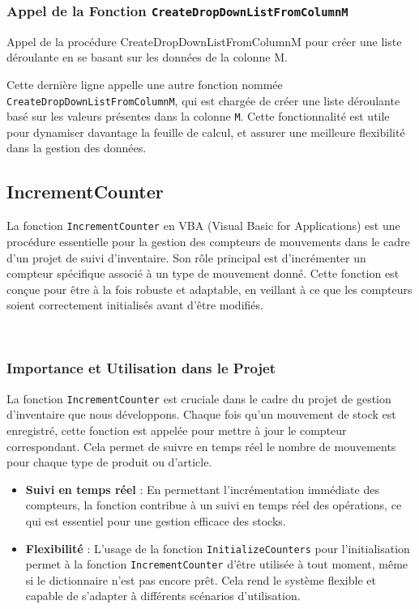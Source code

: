 \documentclass[a4paper, oneside, 12pt, final]{extreport}
\begin{document}
\subsubsection{Appel de la Fonction \texttt{CreateDropDownListFromColumnM}}

Appel de la procédure CreateDropDownListFromColumnM pour créer une liste déroulante en se basant sur les données de la colonne M.

Cette dernière ligne appelle une autre fonction nommée \texttt{CreateDropDownListFromColumnM}, qui est chargée de créer une liste déroulante basé sur les valeurs présentes dans la colonne \texttt{M}. Cette fonctionnalité est utile pour dynamiser davantage la feuille de calcul, et assurer une meilleure flexibilité dans la gestion des données.


\subsection{IncrementCounter}
La fonction \texttt{IncrementCounter} en VBA (Visual Basic for Applications) est une procédure essentielle pour la gestion des compteurs de mouvements dans le cadre d'un projet de suivi d'inventaire. Son rôle principal est d'incrémenter un compteur spécifique associé à un type de mouvement donné. Cette fonction est conçue pour être à la fois robuste et adaptable, en veillant à ce que les compteurs soient correctement initialisés avant d'être modifiés.

\

\subsubsection{Importance et Utilisation dans le Projet}
La fonction \texttt{IncrementCounter} est cruciale dans le cadre du projet de gestion d'inventaire que nous développons. Chaque fois qu'un mouvement de stock est enregistré, cette fonction est appelée pour mettre à jour le compteur correspondant. Cela permet de suivre en temps réel le nombre de mouvements pour chaque type de produit ou d'article.

\begin{itemize}
    \item \textbf{Suivi en temps réel} : En permettant l'incrémentation immédiate des compteurs, la fonction contribue à un suivi en temps réel des opérations, ce qui est essentiel pour une gestion efficace des stocks.
    \item \textbf{Flexibilité} : L'usage de la fonction \texttt{InitializeCounters} pour l'initialisation permet à la fonction \texttt{IncrementCounter} d'être utilisée à tout moment, même si le dictionnaire n'est pas encore prêt. Cela rend le système flexible et capable de s'adapter à différents scénarios d'utilisation.
\end{itemize}
\end{document}
